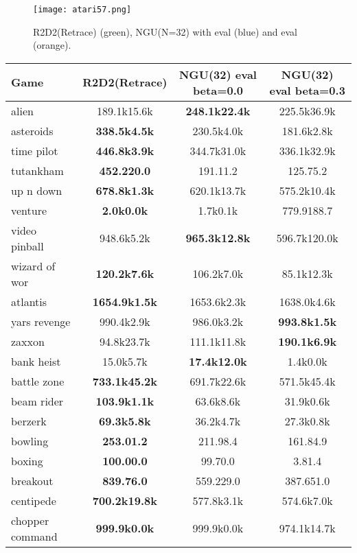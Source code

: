 \documentclass{article} \usepackage{iclr2020_conference,times}
\begin{document}
\begin{figure}[ht!]
    \centering
    \texttt{[image: atari57.png]}  
    \caption{R2D2(Retrace) (green), NGU(N=32) with eval  (blue) and eval  (orange).} 
    \label{atari57}
\end{figure}

\begin{table}[ht!]
\small
\centering
\begin{tabular}{l|c|c|c}
\textbf{Game} & R2D2(Retrace) & NGU(32) eval beta=0.0 & NGU(32) eval beta=0.3 \\ \hline
alien  & 189.1k15.6k & \textbf{248.1k22.4k} & 225.5k36.9k \\
asteroids  & \textbf{338.5k4.5k} & 230.5k4.0k & 181.6k2.8k \\
time pilot  & \textbf{446.8k3.9k} & 344.7k31.0k & 336.1k32.9k \\
tutankham  & \textbf{452.220.0} & 191.11.2 & 125.75.2 \\
up n down  & \textbf{678.8k1.3k} & 620.1k13.7k & 575.2k10.4k \\
venture  & \textbf{2.0k0.0k} & 1.7k0.1k & 779.9188.7 \\
video pinball  & 948.6k5.2k & \textbf{965.3k12.8k} & 596.7k120.0k \\
wizard of wor  & \textbf{120.2k7.6k} & 106.2k7.0k & 85.1k12.3k \\
atlantis  & \textbf{1654.9k1.5k} & 1653.6k2.3k & 1638.0k4.6k \\
yars revenge  & 990.4k2.9k & 986.0k3.2k & \textbf{993.8k1.5k} \\
zaxxon  & 94.8k23.7k & 111.1k11.8k & \textbf{190.1k6.9k} \\
bank heist  & 15.0k5.7k & \textbf{17.4k12.0k} & 1.4k0.0k \\
battle zone  & \textbf{733.1k45.2k} & 691.7k22.6k & 571.5k45.4k \\
beam rider  & \textbf{103.9k1.1k} & 63.6k8.6k & 31.9k0.6k \\
berzerk  & \textbf{69.3k5.8k} & 36.2k4.7k & 27.3k0.8k \\
bowling  & \textbf{253.01.2} & 211.98.4 & 161.84.9 \\
boxing  & \textbf{100.00.0} & 99.70.0 & 3.81.4 \\
breakout  & \textbf{839.76.0} & 559.229.0 & 387.651.0 \\
centipede  & \textbf{700.2k19.8k} & 577.8k3.1k & 574.6k7.0k \\
chopper command  & \textbf{999.9k0.0k} & 999.9k0.0k & 974.1k14.7k \\

\end{tabular}
\end{table}
\end{document}
